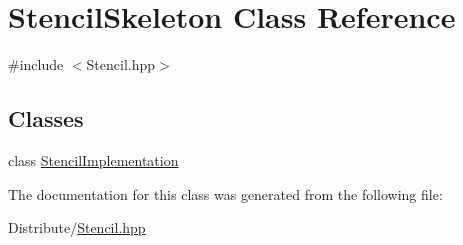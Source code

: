 \hypertarget{classStencilSkeleton}{\section{Stencil\-Skeleton Class Reference}
\label{classStencilSkeleton}
}


{\ttfamily \#include $<$Stencil.\-hpp$>$}

\subsection*{Classes}
\begin{DoxyCompactItemize}
\item 
class \hyperlink{classStencilSkeleton_1_1StencilImplementation}{Stencil\-Implementation}
\end{DoxyCompactItemize}


The documentation for this class was generated from the following file\-:\begin{DoxyCompactItemize}
\item 
Distribute/\hyperlink{Stencil_8hpp}{Stencil.\-hpp}\end{DoxyCompactItemize}

